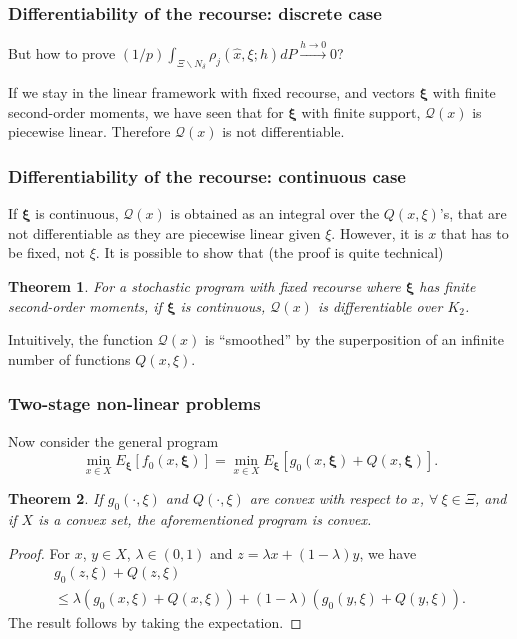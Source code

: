 \documentclass{beamer}
\newtheorem{theo}{Theorem}
\def\bxi{\boldsymbol\xi}
\def\bxi{\boldsymbol\xi}
\begin{document}
\begin{frame}
\frametitle{Differentiability of the recourse: discrete case}

But how to prove $(1/p) \int_{\Xi
  \backslash N_{\delta}} \rho_j (\hat{x}, \xi; h) dP \overset{h
  \rightarrow 0}{\rightarrow } 0$?

\mbox{}

If we stay in the linear framework with fixed recourse, and vectors $\bxi$ with finite second-order moments, we have seen that for $\bxi$ with finite support, $\mathcal{Q}(x)$ is piecewise linear.
Therefore $\mathcal{Q}(x)$ is not differentiable.

\end{frame}

\begin{frame}
\frametitle{Differentiability of the recourse: continuous case}

If $\bxi$ is continuous, $\mathcal{Q}(x)$ is obtained as an integral over the $Q(x,\xi)$'s, that are not differentiable as they are piecewise linear given $\xi$.
However, it is $x$ that has to be fixed, not $\xi$.
It is possible to show that (the proof is quite technical)

\mbox{}

\begin{theo}
For a stochastic program with fixed recourse where $\bxi$ has finite second-order moments, if $\bxi$ is continuous, $\mathcal{Q}(x)$ is differentiable over $K_2$.
\end{theo}

\mbox{}

Intuitively, the function $\mathcal{Q}(x)$ is ``smoothed'' by the superposition of an infinite number of functions $Q(x,\xi)$.

\end{frame}

\begin{frame}
\frametitle{Two-stage non-linear problems}

Now consider the general program
\[
\min_{x \in X} E_{\bxi} [ f_0(x, \bxi) ] = \min_{x \in X}
E_{\bxi} [g_0(x,\bxi) + Q(x, \bxi)].
\]

\begin{theo}
If $g_0(\cdot,\xi)$ and $ Q(\cdot, \xi)$ are convex with respect to $x$, $\forall\ \xi \in \Xi$, and if $X$ is a convex set, the aforementioned program is convex.
\end{theo}
\begin{proof}
For $x$, $y \in X$, $\lambda \in (0,1)$ and $z = \lambda x +
(1-\lambda) y$, we have
\begin{multline*}
g_0(z, \xi) + Q(z, \xi) \\
\leq \lambda (g_0(x, \xi) + Q(x,
\xi)) + (1-\lambda)(g_0(y, \xi) + Q(y, \xi)).
\end{multline*}
The result follows by taking the expectation.
\end{proof}

\end{frame}
\end{document}
